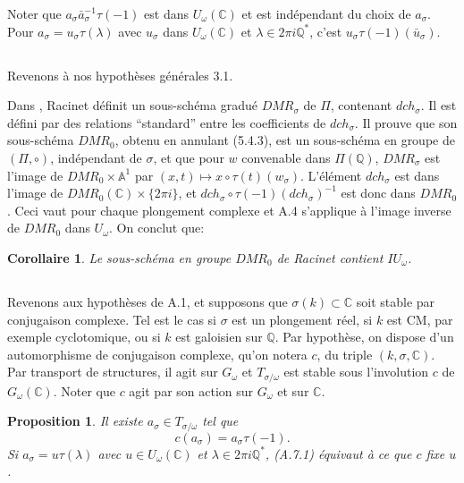 \documentclass[11pt,a4paper]{article}
\theoremstyle{plain}
\newtheorem{proposition}[theorem]{Proposition}
\newtheorem{corollary}[theorem]{Corollaire}
\theoremstyle{definition}
\newcommand{\DMR}{\mathit{DMR}}
\newcommand{\dch}{\mathit{dch}}
\newcommand{\Q}{\mathbb{Q}}
\newcommand{\C}{\mathbb{C}}
\newcommand{\A}{\mathbb{A}}
\begin{document}
Noter que $a_\sigma \bar{a}_\sigma^{-1} \tau(-1)$ est dans $U_\omega(\C)$ et est ind\'ependant du choix de $a_\sigma$. Pour $a_\sigma = u_\sigma \tau(\lambda)$ avec $u_\sigma$ dans $U_\omega(\C)$ et $\lambda \in 2\pi i \Q^*$, c'est $u_\sigma \tau(-1)(\bar{u}_\sigma)$.

\subsection{}
Revenons \`a nos hypoth\`eses g\'en\'erales 3.1.

Dans \cite{2}, Racinet d\'efinit un sous-sch\'ema gradu\'e $\DMR_\sigma$ de $\Pi$, contenant $\dch_\sigma$. Il est d\'efini par des relations ``standard'' entre les coefficients de $\dch_\sigma$. Il prouve que son sous-sch\'ema $\DMR_0$, obtenu en annulant (5.4.3), est un sous-sch\'ema en groupe de $(\Pi, \circ)$, ind\'ependant de $\sigma$, et que pour $w$ convenable dans $\Pi(\Q)$, $\DMR_\sigma$ est l'image de $\DMR_0 \times \A^1$ par $(x,t) \mapsto x \circ \tau(t)(w_\sigma)$. L'\'el\'ement $\dch_\sigma$ est dans l'image de $\DMR_0(\C) \times \{2\pi i\}$, et $\dch_\sigma \circ \tau(-1)(\dch_\sigma)^{-1}$ est donc dans $\DMR_0$. Ceci vaut pour chaque plongement complexe et A.4 s'applique \`a l'image inverse de $\DMR_0$ dans $U_\omega$. On conclut que:

\begin{corollary}\label{cor:A.5}
Le sous-sch\'ema en groupe $\DMR_0$ de Racinet contient $IU_\omega$.
\end{corollary}

\subsection{}
Revenons aux hypoth\`eses de A.1, et supposons que $\sigma(k) \subset \C$ soit stable par conjugaison complexe. Tel est le cas si $\sigma$ est un plongement r\'eel, si $k$ est CM, par exemple cyclotomique, ou si $k$ est galoisien sur $\Q$. Par hypoth\`ese, on dispose d'un automorphisme de conjugaison complexe, qu'on notera $c$, du triple $(k, \sigma, \C)$. Par transport de structures, il agit sur $G_\omega$ et $T_{\sigma/\omega}$ est stable sous l'involution $c$ de $G_\omega(\C)$. Noter que $c$ agit par son action sur $G_\omega$ et sur $\C$.

\begin{proposition}\label{prop:A.7}
Il existe $a_\sigma \in T_{\sigma/\omega}$ tel que
\begin{equation}\label{eq:A.7.1}
c(a_\sigma) = a_\sigma \tau(-1).
\end{equation}
Si $a_\sigma = u \tau(\lambda)$ avec $u \in U_\omega(\C)$ et $\lambda \in 2\pi i \Q^*$, (A.7.1) \'equivaut \`a ce que $c$ fixe $u$.
\end{proposition}
\end{document}
